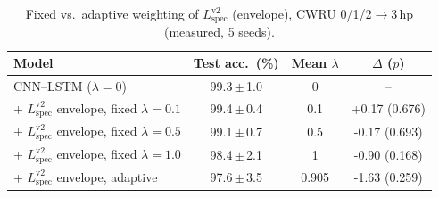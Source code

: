 \begin{table}[t]
\caption{Fixed vs.\ adaptive weighting of $L_{\mathrm{spec}}^{\mathrm{v2}}$ (envelope), CWRU 0/1/2$\to$3\,hp (measured, 5 seeds).}
\label{tab:weighting}
\centering
\footnotesize
\begin{tabular}{lccc}
\toprule
Model & Test acc.\ (\%) & Mean $\lambda$ & $\Delta$ ($p$) \\
\midrule
CNN--LSTM ($\lambda=0$) & 99.3\,$\pm$\,1.0 & 0 & -- \\
+ $L_{\mathrm{spec}}^{\mathrm{v2}}$ envelope, fixed $\lambda=0.1$ & 99.4\,$\pm$\,0.4 & 0.1 & +0.17 (0.676) \\
+ $L_{\mathrm{spec}}^{\mathrm{v2}}$ envelope, fixed $\lambda=0.5$ & 99.1\,$\pm$\,0.7 & 0.5 & -0.17 (0.693) \\
+ $L_{\mathrm{spec}}^{\mathrm{v2}}$ envelope, fixed $\lambda=1.0$ & 98.4\,$\pm$\,2.1 & 1 & -0.90 (0.168) \\
+ $L_{\mathrm{spec}}^{\mathrm{v2}}$ envelope, adaptive & 97.6\,$\pm$\,3.5 & 0.905 & -1.63 (0.259) \\
\bottomrule
\end{tabular}
\end{table}
